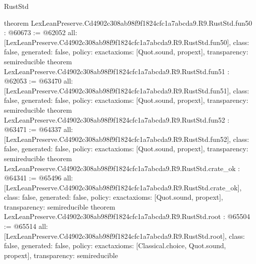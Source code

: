 \begin{lexlean}{RustStd}
\begin{coremodule}
{}
theorem LexLeanPreserve.Cd4902c308ab98f9f1824cfc1a7abcda9.R9.RustStd.fun50 : @60673 := @62052 {
  all: [LexLeanPreserve.Cd4902c308ab98f9f1824cfc1a7abcda9.R9.RustStd.fun50],
  class: false,
  generated: false,
  policy: exact{axioms: [Quot.sound, propext]},
  transparency: semireducible
}
theorem LexLeanPreserve.Cd4902c308ab98f9f1824cfc1a7abcda9.R9.RustStd.fun51 : @62053 := @63470 {
  all: [LexLeanPreserve.Cd4902c308ab98f9f1824cfc1a7abcda9.R9.RustStd.fun51],
  class: false,
  generated: false,
  policy: exact{axioms: [Quot.sound, propext]},
  transparency: semireducible
}
theorem LexLeanPreserve.Cd4902c308ab98f9f1824cfc1a7abcda9.R9.RustStd.fun52 : @63471 := @64337 {
  all: [LexLeanPreserve.Cd4902c308ab98f9f1824cfc1a7abcda9.R9.RustStd.fun52],
  class: false,
  generated: false,
  policy: exact{axioms: [Quot.sound, propext]},
  transparency: semireducible
}
theorem LexLeanPreserve.Cd4902c308ab98f9f1824cfc1a7abcda9.R9.RustStd.crate_ok : @64341 := @65496 {
  all: [LexLeanPreserve.Cd4902c308ab98f9f1824cfc1a7abcda9.R9.RustStd.crate_ok],
  class: false,
  generated: false,
  policy: exact{axioms: [Quot.sound, propext]},
  transparency: semireducible
}
theorem LexLeanPreserve.Cd4902c308ab98f9f1824cfc1a7abcda9.R9.RustStd.root : @65504 := @65514 {
  all: [LexLeanPreserve.Cd4902c308ab98f9f1824cfc1a7abcda9.R9.RustStd.root],
  class: false,
  generated: false,
  policy: exact{axioms: [Classical.choice, Quot.sound, propext]},
  transparency: semireducible
}


\end{coremodule}
\end{lexlean}
